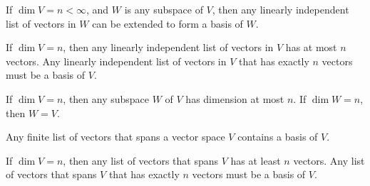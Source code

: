 

\endedxproblem


\endedxvertical










{}  If $\dim V = n < \infty$, and $W$ is any subspace of $V$, then any
linearly independent list of vectors in $W$ can be extended to form a basis of $W$.  

{} If $\dim V = n$, then any linearly independent list of vectors in $V$ has
at most $n$ vectors.  Any linearly independent list of vectors in $V$ that has exactly $n$ vectors must
be a basis of $V$.  


{} If $\dim V = n$, then any subspace $W$ of $V$ has dimension at most $n$.  
If $\dim W = n$, then $W = V$.  


{} Any finite list of vectors that spans a vector space $V$ contains a basis of $V$.  

{} If $\dim V = n$, then any list of vectors that spans $V$ has
at least $n$ vectors.  Any  list of vectors that spans $V$ that has exactly $n$ vectors must
be a basis of $V$.  


